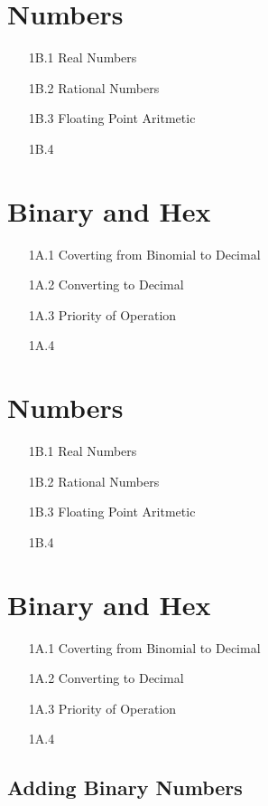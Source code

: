 \documentclass{article}
\begin{document}
\section*{Numbers}
\begin{itemize}
\item[1B.1] Real Numbers
\item[1B.2] Rational Numbers
\item[1B.3] Floating Point Aritmetic
\item[1B.4] 
\end{itemize}
\section*{Binary and Hex}
\begin{itemize}
\item[1A.1] Coverting from Binomial to Decimal
\item[1A.2] Converting to Decimal
\item[1A.3] Priority of Operation
\item[1A.4] 
\end{itemize}
\section*{Numbers}
\begin{itemize}
\item[1B.1] Real Numbers
\item[1B.2] Rational Numbers
\item[1B.3] Floating Point Aritmetic
\item[1B.4] 
\end{itemize}
\section*{Binary and Hex}
\begin{itemize}
\item[1A.1] Coverting from Binomial to Decimal
\item[1A.2] Converting to Decimal
\item[1A.3] Priority of Operation
\item[1A.4] 
\end{itemize}
\newpage
\subsection*{Adding Binary Numbers}
\end{document}
